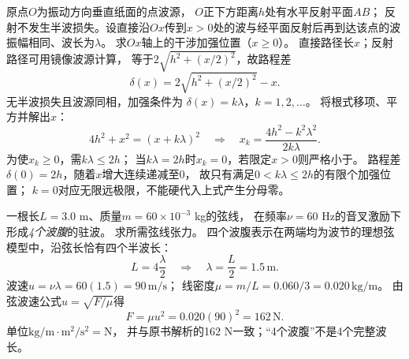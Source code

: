 \problemtext 原点$O$为振动方向垂直纸面的点波源，
$O$正下方距离$h$处有水平反射平面$AB$；
反射不发生半波损失。设直接沿$Ox$传到$x>0$处的波与经平面反射后再到达该点的波振幅相同、波长为$\lambda$。
求$Ox$轴上的干涉加强位置（$x\ge0$）。
\workings
直接路径长$x$；反射路径可用镜像波源计算，
等于$2\sqrt{h^2+(x/2)^2}$，故路程差
\[
\delta(x)=2\sqrt{h^2+(x/2)^2}-x.
\]
无半波损失且波源同相，加强条件为
$\delta(x)=k\lambda$，$k=1,2,\ldots$。
将根式移项、平方并解出$x$：
\[
4h^2+x^2=(x+k\lambda)^2
\quad\Longrightarrow\quad
\boxed{x_k=\frac{4h^2-k^2\lambda^2}{2k\lambda}}.
\]
为使$x_k\ge0$，需$k\lambda\le2h$；
当$k\lambda=2h$时$x_k=0$，若限定$x>0$则严格小于。
\crosscheck 路程差$\delta(0)=2h$，随着$x$增大连续递减至0，
故只有满足$0<k\lambda\le2h$的有限个加强位置；
$k=0$对应无限远极限，不能硬代入上式产生分母零。

\problemtext 一根长$L=3.0$ m、质量$m=60\times10^{-3}$ kg的弦线，
在频率$\nu=60$ Hz的音叉激励下形成\emph{4个波腹}的驻波。
求所需弦线张力。
\workings
四个波腹表示在两端均为波节的理想弦模型中，沿弦长恰有四个半波长：
\[
L=4\frac{\lambda}{2}
\quad\Longrightarrow\quad
\boxed{\lambda=\frac L2=1.5\,\mathrm m}.
\]
波速$u=\nu\lambda=60(1.5)=90\,\mathrm{m/s}$；
线密度$\mu=m/L=0.060/3=0.020\,\mathrm{kg/m}$。
由弦波速公式$u=\sqrt{F/\mu}$得
\[
\boxed{F=\mu u^2=0.020(90)^2=162\,\mathrm N}.
\]
\crosscheck 单位$\mathrm{kg/m}\cdot\mathrm{m^2/s^2}=\mathrm N$，
并与原书解析的162 N一致；“4个波腹”不是4个完整波长。
